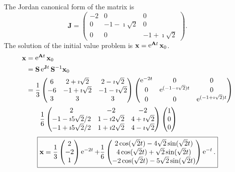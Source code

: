 {\begin{Solution}
  The Jordan canonical form of the matrix is
  \[
  \mathbf{J} =
  \begin{pmatrix}
    -2 & 0 & 0 \\
    0 & -1 - \imath \sqrt{2} & 0 \\
    0 & 0 & -1 + \imath \sqrt{2}
  \end{pmatrix}.
  \]
  The solution of the initial value problem is $\mathbf{x} = \mathop{\mathrm{e}}\nolimits^{\mathbf{A} t} \mathbf{x}_0$.
  \begin{align*}
    \mathbf{x} &= \mathop{\mathrm{e}}\nolimits^{\mathbf{A} t} \mathbf{x}_0 \\
    &= \mathbf{S} \mathop{\mathrm{e}}\nolimits^{\mathbf{J} t} \mathbf{S}^{-1} \mathbf{x}_0 \\
    &= \frac{1}{3}
    \begin{pmatrix} 6 & 2 + \imath \sqrt{2} & 2 - \imath \sqrt{2} \\
      -6 & -1 + \imath \sqrt{2} & -1 - \imath \sqrt{2} \\
      3 & 3 & 3 \end{pmatrix}
    \begin{pmatrix} \mathop{\mathrm{e}}\nolimits^{-2t} & 0 & 0 \\ 
      0 & \mathop{\mathrm{e}}\nolimits^{(-1 - \imath \sqrt{2})t} & 0 \\ 
      0 & 0 & \mathop{\mathrm{e}}\nolimits^{(-1 + \imath \sqrt{2})t} \end{pmatrix} \\
    &\qquad \frac{1}{6} 
    \begin{pmatrix} 2 & -2 & -2 \\
      -1-\imath 5\sqrt{2}/2 & 1-\imath 2\sqrt{2} & 4+\imath \sqrt{2} \\
      -1+\imath 5\sqrt{2}/2 & 1+\imath 2\sqrt{2} & 4-\imath \sqrt{2} 
    \end{pmatrix}
    \begin{pmatrix} 1 \\ 0 \\ 0 \end{pmatrix}
  \end{align*}
  \[
  \boxed{
    \mathbf{x} = 
    \frac{1}{3} \begin{pmatrix} 2 \\ -2 \\ 1 \end{pmatrix} \mathop{\mathrm{e}}\nolimits^{-2 t}
    + \frac{1}{6} \begin{pmatrix} 
      2 \cos(\sqrt{2} t) - 4 \sqrt{2} \sin(\sqrt{2} t) \\
      4 \cos(\sqrt{2} t) + \sqrt{2} \sin(\sqrt{2} t) \\
      -2 \cos(\sqrt{2} t) - 5 \sqrt{2} \sin(\sqrt{2} t) \\
    \end{pmatrix} \mathop{\mathrm{e}}\nolimits^{-t}.
    }
  \]
\end{Solution}







}
